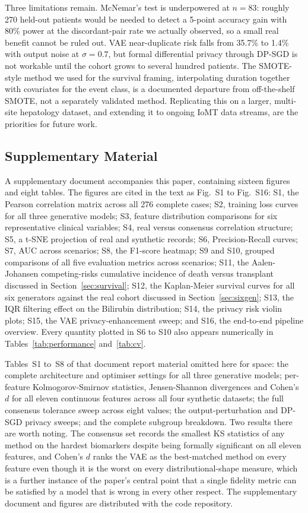 \documentclass[journal]{IEEEtran}
\begin{document}
Three limitations remain. McNemar's test is underpowered at $n=83$: roughly 270 held-out patients would be needed to detect a 5-point accuracy gain with 80\% power at the discordant-pair rate we actually observed, so a small real benefit cannot be ruled out. VAE near-duplicate risk falls from 35.7\% to 1.4\% with output noise at $\sigma=0.7$, but formal differential privacy through DP-SGD is not workable until the cohort grows to several hundred patients. The SMOTE-style method we used for the survival framing, interpolating duration together with covariates for the event class, is a documented departure from off-the-shelf SMOTE, not a separately validated method. Replicating this on a larger, multi-site hepatology dataset, and extending it to ongoing IoMT data streams, are the priorities for future work.

\subsection*{Supplementary Material}
A supplementary document accompanies this paper, containing sixteen figures and eight tables. The figures are cited in the text as Fig.~S1 to Fig.~S16: S1, the Pearson correlation matrix across all 276 complete cases; S2, training loss curves for all three generative models; S3, feature distribution comparisons for six representative clinical variables; S4, real versus consensus correlation structure; S5, a t-SNE projection of real and synthetic records; S6, Precision-Recall curves; S7, AUC across scenarios; S8, the F1-score heatmap; S9 and S10, grouped comparisons of all five evaluation metrics across scenarios; S11, the Aalen-Johansen competing-risks cumulative incidence of death versus transplant discussed in Section~\ref{sec:survival}; S12, the Kaplan-Meier survival curves for all six generators against the real cohort discussed in Section~\ref{sec:sixgen}; S13, the IQR filtering effect on the Bilirubin distribution; S14, the privacy risk violin plots; S15, the VAE privacy-enhancement sweep; and S16, the end-to-end pipeline overview. Every quantity plotted in S6 to S10 also appears numerically in Tables~\ref{tab:performance} and~\ref{tab:cv}.

Tables~S1 to~S8 of that document report material omitted here for space: the complete architecture and optimiser settings for all three generative models; per-feature Kolmogorov-Smirnov statistics, Jensen-Shannon divergences and Cohen's $d$ for all eleven continuous features across all four synthetic datasets; the full consensus tolerance sweep across eight values; the output-perturbation and DP-SGD privacy sweeps; and the complete subgroup breakdown. Two results there are worth noting. The consensus set records the smallest KS statistics of any method on the hardest biomarkers despite being formally significant on all eleven features, and Cohen's $d$ ranks the VAE as the best-matched method on every feature even though it is the worst on every distributional-shape measure, which is a further instance of the paper's central point that a single fidelity metric can be satisfied by a model that is wrong in every other respect. The supplementary document and figures are distributed with the code repository.
\end{document}
